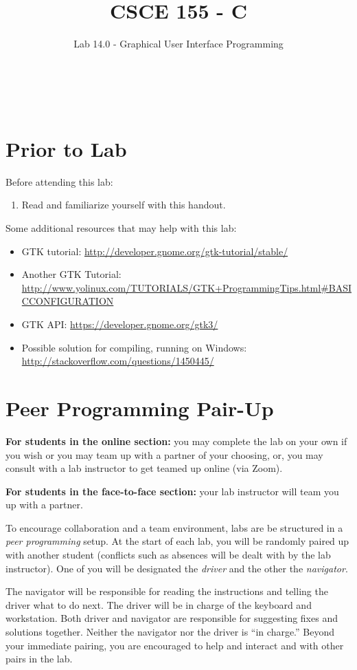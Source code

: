 \documentclass[12pt]{scrartcl}
\title{CSCE 155 - C}
\subtitle{Lab 14.0 - Graphical User Interface Programming}
\author{~}
\date{~}
\begin{document}
\maketitle

\section*{Prior to Lab}

Before attending this lab:
\begin{enumerate}
  \item Read and familiarize yourself with this handout.
\end{enumerate}

Some additional resources that may help with this lab:
\begin{itemize}
  \item GTK tutorial: \url{http://developer.gnome.org/gtk-tutorial/stable/}
  \item Another GTK Tutorial: \\
  \url{http://www.yolinux.com/TUTORIALS/GTK+ProgrammingTips.html#BASICCONFIGURATION}
  \item GTK API: \url{https://developer.gnome.org/gtk3/}
  \item Possible solution for compiling, running on Windows: \\
  \url{http://stackoverflow.com/questions/1450445/}
\end{itemize}

\section*{Peer Programming Pair-Up}

\textbf{For students in the online section:} you may complete
the lab on your own if you wish or you may team up with a partner
of your choosing, or, you may consult with a lab instructor to get
teamed up online (via Zoom).

\textbf{For students in the face-to-face section:} your
lab instructor will team you up with a partner.  

To encourage collaboration and a team environment, labs are be
structured in a \emph{peer programming} setup.  At the start of
each lab, you will be randomly paired up with another student 
(conflicts such as absences will be dealt with by the lab instructor).
One of you will be designated the \emph{driver} and the other
the \emph{navigator}.  

The navigator will be responsible for reading the instructions and
telling the driver what to do next.  The driver will be in charge of the
keyboard and workstation.  Both driver and navigator are responsible
for suggesting fixes and solutions together.  Neither the navigator
nor the driver is ``in charge.''  Beyond your immediate pairing, you
are encouraged to help and interact and with other pairs in the lab.
\end{document}
